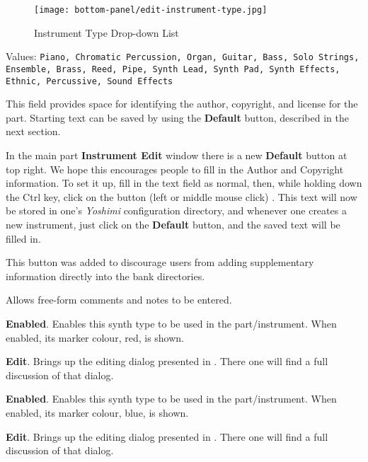 \begin{figure}[H]
   \centering
   \texttt{[image: bottom-panel/edit-instrument-type.jpg]}
   \caption{Instrument Type Drop-down List}
   \label{fig:instrument_type_dropdown}
\end{figure}

   Values: \texttt{Piano, Chromatic Percussion, Organ, Guitar, Bass,
              Solo Strings, Ensemble, Brass, Reed, Pipe,
              Synth Lead, Synth Pad, Synth Effects, Ethnic,
              Percussive, Sound Effects}

   This field provides space for identifying the author, copyright, and
   license for the part.  Starting text can be saved by using the
   \textbf{Default} button, described in the next section.

   In the main part \textbf{Instrument Edit} window there is a new
   \textbf{Default} button at top right.
   We hope this encourages people
   to fill in the Author and Copyright information.
   To set it up, fill in the text field as normal,
   then, while holding down the Ctrl key, click on the button
   (left or middle mouse click) . This text will now be stored in
   one's \textsl{Yoshimi} configuration directory,
   and whenever one creates a new instrument, just
   click on the \textbf{Default} button, and the saved text will be
   filled in.

   This button was added to discourage users from adding supplementary
   information directly into the bank directories.

   Allows free-form comments and notes to be entered.


   \begin{enumber}
      \item \textbf{Enabled}.
      Enables this synth type to be used in the part/instrument.
      When enabled, its marker colour, red, is shown.
      \item \textbf{Edit}.
      Brings up the editing dialog presented in
      .
      There one will find a full discussion of that dialog.
   \end{enumber}


   \begin{enumber}
      \item \textbf{Enabled}.
      Enables this synth type to be used in the part/instrument.
      When enabled, its marker colour, blue, is shown.
      \item \textbf{Edit}.
      Brings up the editing dialog presented in
      .
      There one will find a full discussion of that dialog.
   \end{enumber}

